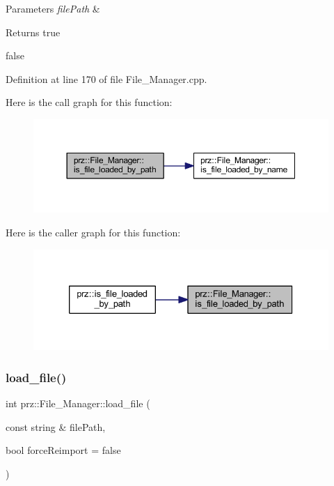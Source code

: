 \begin{DoxyParams}{Parameters}
{\em file\+Path} & \\
\hline
\end{DoxyParams}
\begin{DoxyReturn}{Returns}
true 

false 
\end{DoxyReturn}


Definition at line 170 of file File\+\_\+\+Manager.\+cpp.

Here is the call graph for this function\+:
\nopagebreak
\begin{figure}[H]
\begin{center}
\leavevmode
\includegraphics[width=350pt]{classprz_1_1_file___manager_ab1b6f6447621351af16262236dad73b3_cgraph}
\end{center}
\end{figure}
Here is the caller graph for this function\+:
\nopagebreak
\begin{figure}[H]
\begin{center}
\leavevmode
\includegraphics[width=326pt]{classprz_1_1_file___manager_ab1b6f6447621351af16262236dad73b3_icgraph}
\end{center}
\end{figure}
\mbox{\label{classprz_1_1_file___manager_aad862a71b68f6bb1870b1750f33e70f4}} 
\subsubsection{\texorpdfstring{load\_file()}{load\_file()}}
{\footnotesize\ttfamily int prz\+::\+File\+\_\+\+Manager\+::load\+\_\+file (\begin{DoxyParamCaption}\item[{const string \&}]{file\+Path,  }\item[{bool}]{force\+Reimport = {\ttfamily false} }\end{DoxyParamCaption})}



